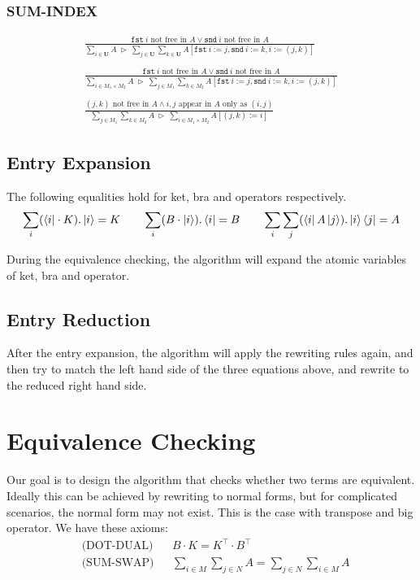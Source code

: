 \documentclass[manuscript, review, timestamp]{acmart}
\newcommand*{\fst}{\texttt{fst}}
\newcommand*{\snd}{\texttt{snd}}
\newcommand*{\reduce}{\ \triangleright\ }
\begin{document}
\subsubsection*{SUM-INDEX}
\begin{gather*}
  \frac{\fst\ i \text{ not free in } A \vee \snd\ i \text{ not free in } A}{\sum_{i\in\mathbf{U}}A \reduce \sum_{j\in\mathbf{U}}\sum_{k\in\mathbf{U}}A[\fst\ i:=j, \snd\ i:=k, i:=(j,k)]}
  \\
  \\
  \frac{\fst\ i \text{ not free in } A \vee \snd\ i \text{ not free in } A}{\sum_{i\in M_1 \times M_2}A \reduce \sum_{j\in M_1}\sum_{k\in M_2}A[\fst\ i:=j, \snd\ i:=k, i:=(j,k)]}
  \\
  \\
  \frac{(j, k) \text{ not free in } A \wedge i, j \text{ appear in } A \text{ only as } (i, j)}{\sum_{j\in M_1}\sum_{k\in M_2}A \reduce \sum_{i\in M_1\times M_2}A[(j,k):=i]}
\end{gather*}

\subsection{Entry Expansion}

The following equalities hold for ket, bra and operators respectively. 
\begin{gather*}
  \sum_i (\bra{i} \cdot K).\ket{i} = K
  \qquad
  \sum_i (B \cdot \ket{i}).\bra{i} = B
  \qquad
  \sum_i \sum_j (\bra{i} A \ket{j}).\ket{i}\bra{j} = A
\end{gather*}

During the equivalence checking, the algorithm will expand the atomic variables of ket, bra and operator.

\subsection{Entry Reduction}

After the entry expansion, the algorithm will apply the rewriting rules again, and then try to match the left hand side of the three equations above, and rewrite to the reduced right hand side.

\section{Equivalence Checking}

Our goal is to design the algorithm that checks whether two terms are equivalent. Ideally this can be achieved by rewriting to normal forms, but for complicated scenarios, the normal form may not exist. This is the case with transpose and big operator. We have these axioms: 
\begin{align*}
& \text{(DOT-DUAL)} && B \cdot K = K^\top \cdot B^\top \\
& \text{(SUM-SWAP)} && \sum_{i \in M} \sum_{j \in N} A = \sum_{j \in N} \sum_{i \in M} A 
\end{align*}
\end{document}
